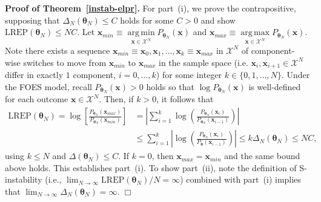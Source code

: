\documentclass[12pt]{article}
\theoremstyle{definition}
\DeclareMathOperator*{\argmin}{arg\,min}
\DeclareMathOperator*{\argmax}{arg\,max}
\newcommand{\REP}{\mathrm{LREP}}
\newcommand{\DN}{\Delta_N}
\begin{document}
\textbf{Proof of Theorem~\ref{instab-elpr}.} For part~(i), we prove the
contrapositive, supposing that \(\DN(\boldsymbol \theta_N) \le C\)
holds for some \(C > 0\) and show
\(\REP(\boldsymbol \theta_N) \leq NC\). Let
\(\boldsymbol x_{min} \equiv \argmin\limits_{\boldsymbol x \in \mathcal{X}^N}P_{\boldsymbol \theta_N}(\boldsymbol x)\)
and
\(\boldsymbol x_{max} \equiv \argmax\limits_{\boldsymbol x \in \mathcal{X}^N}P_{\boldsymbol \theta_N}(\boldsymbol x)\).
Note there exists a sequence
\(\boldsymbol x_{min} \equiv \boldsymbol x_0, \boldsymbol x_1, \dots, \boldsymbol x_k \equiv \boldsymbol x_{max}\)
in \(\mathcal{X}^N\) of component-wise switches to move from
\(\boldsymbol x_{min}\) to \(\boldsymbol x_{max}\) in the sample space
(i.e. \(\boldsymbol x_i, \boldsymbol x_{i + 1} \in \mathcal{X}^N\)
differ in exactly \(1\) component, \(i = 0, \dots, k\)) for some
integer \(k \in \{0, 1, \dots, N\}\). Under the FOES model, recall
\(P_{\boldsymbol \theta_N}(\boldsymbol x) > 0\) holds so that
\(\log P_{\boldsymbol \theta_N}(\boldsymbol x)\) is well-defined for
each outcome \(\boldsymbol x \in \mathcal{X}^N\). Then, if \(k > 0\), it
follows that
\begin{align*}
\REP(\boldsymbol \theta_N) = \log\left[\frac{P_{\boldsymbol \theta_N}(\boldsymbol x_{max})}{P_{\boldsymbol \theta_N}(\boldsymbol x_{min})}\right] &= \left|\sum\limits_{i = 1}^k\log\left(\frac{P_{\boldsymbol \theta_N}(\boldsymbol x_i)}{P_{\boldsymbol \theta_N}(\boldsymbol x_{i-1})}\right)\right| \\
&\le \sum\limits_{i = 1}^k\left|\log\left(\frac{P_{\boldsymbol \theta_N}(\boldsymbol x_i)}{P_{\boldsymbol \theta}(\boldsymbol x_{i-1})}\right)\right| \le k \Delta_N(\boldsymbol \theta_N) \le NC,
\end{align*}
using \(k \le N\) and \(\Delta(\boldsymbol \theta_N) \le C\). If
\(k = 0\), then \(\boldsymbol x_{max} = \boldsymbol x_{min}\) and the
same bound above holds.  This establishes part~(i).  To show part~(ii), note   the definition of S-instability (i.e., $\lim_{N\to \infty}\REP(\boldsymbol \theta_N)/N= \infty$) combined with part~(i) implies that $\lim_{N\to \infty}\DN(\boldsymbol \theta_N)=\infty$.    \hfill \(\Box\)
\end{document}
